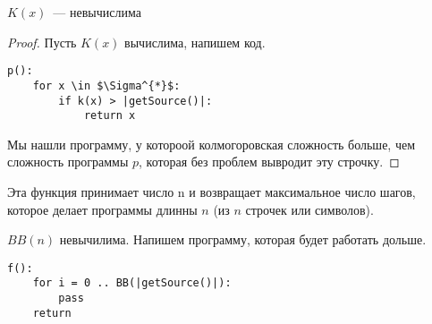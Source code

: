 \begin{statement}
    $K(x)$~--- невычислима
\end{statement}
\begin{proof}
    Пусть $K(x)$ вычислима, напишем код.
\begin{lstlisting}[mathescape=true]
p():
    for x \in $\Sigma^{*}$:
        if k(x) > |getSource()|:
            return x
\end{lstlisting}
Мы нашли программу, у котороой колмогоровская сложность больше, чем сложность программы $p$, которая без проблем вывродит эту строчку.
\end{proof}

\begin{example}
    Эта функция принимает число n и возвращает максимальное число шагов, которое делает программы длинны $n$ (из $n$ строчек или символов).
\end{example}

\begin{statement}
    $BB(n)$ невычилима. Напишем программу, которая будет работать дольше.
\begin{lstlisting}[mathescape=true]
f():
    for i = 0 .. BB(|getSource()|):
        pass
    return
\end{lstlisting}
\end{statement}
